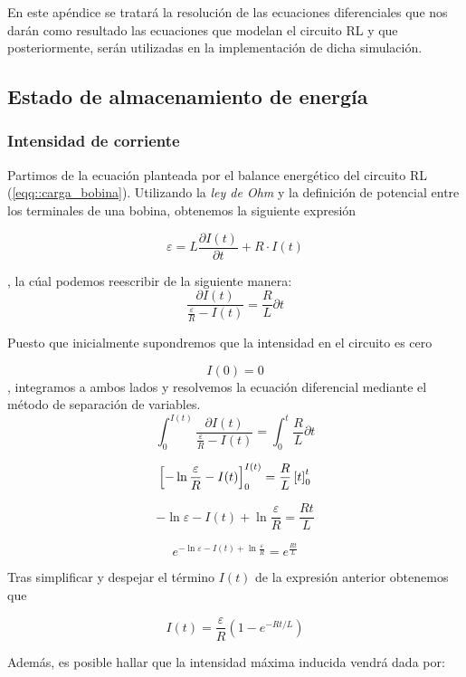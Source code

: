 \documentclass[../main.tex]{subfiles}
\begin{document}
\label{apendice_ecuaciones_2}


En este apéndice se tratará la resolución de las ecuaciones diferenciales que nos darán como resultado las ecuaciones que modelan el circuito RL y que posteriormente, serán utilizadas en la implementación de dicha simulación.

\subsection{Estado de almacenamiento de energía}

\subsubsection{Intensidad de corriente}
\label{part::carga_inductor_1}

Partimos de la ecuación planteada por el balance energético del circuito RL (\ref{eqq::carga_bobina}). Utilizando la \textit{ley de Ohm} y la definición de potencial entre los terminales de una bobina, obtenemos la siguiente expresión

$$\varepsilon = L\frac{\partial I(t)}{\partial t} + R \cdot I(t)$$

, la cúal podemos reescribir de la siguiente manera:
$$\frac{\partial I(t)}{\frac{\varepsilon}{R} - I(t)} = \frac{R}{L} \partial t$$


Puesto que inicialmente supondremos que la intensidad en el circuito es cero

$$I(0) = 0$$
, integramos a ambos lados y resolvemos la ecuación diferencial mediante el método de separación de variables.
$$\int_0^{I(t)} \frac{\partial I(t)}{\frac{\varepsilon}{R} - I(t)} = \int_0^t  \frac{R}{L} \partial t$$

$$\Bigl[ -\ln{\frac{\varepsilon}{R} - I(t)} \Bigr]_0^{I(t)} = \frac{R}{L}\left[ t\right]_0^t$$

$$-\ln{\varepsilon - I(t)} + \ln{\frac{\varepsilon}{R}} = \frac{Rt}{L}$$

$$e^{-\ln{\varepsilon - I(t)} + \ln{\frac{\varepsilon}{R}}} = e^{\frac{Rt}{L}}$$

Tras simplificar y despejar el término $I(t)$ de la expresión anterior obtenemos que

\begin{equation}
    I(t) = \frac{\varepsilon}{R}\left( 1- e^{-Rt/L}\right)
\end{equation}

Además, es posible hallar que la intensidad máxima inducida vendrá dada por:
\end{document}
